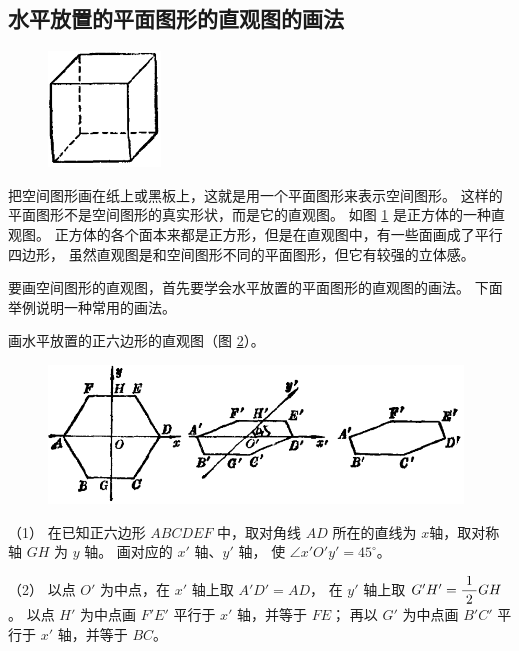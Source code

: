 \subsection{水平放置的平面图形的直观图的画法}\label{subsec:1-3}

\begin{enhancedline}

\begin{figure}
    \centering
    \includegraphics[width=3cm]{../pic/ltjh-ch1-08.png}
    \caption{}\label{fig:ltjh-1-8}
\end{figure}

把空间图形画在纸上或黑板上，这就是用一个平面图形来表示空间图形。
这样的平面图形不是空间图形的真实形状，而是它的直观图。
如图 \ref{fig:ltjh-1-8} 是正方体的一种直观图。
正方体的各个面本来都是正方形，但是在直观图中，有一些面画成了平行四边形，
虽然直观图是和空间图形不同的平面图形，但它有较强的立体感。

要画空间图形的直观图，首先要学会水平放置的平面图形的直观图的画法。
下面举例说明一种常用的画法。


\liti 画水平放置的正六边形的直观图（图 \ref{fig:ltjh-1-9}）。

\begin{figure}[htbp]
    \centering
    \includegraphics[width=11cm]{../pic/ltjh-ch1-09.png}
    \caption{}\label{fig:ltjh-1-9}
\end{figure}

\huafa （1） 在已知正六边形 $ABCDEF$ 中，取对角线 $AD$ 所在的直线为 $x$轴，取对称轴 $GH$ 为 $y$ 轴。
画对应的 $x'$ 轴、$y'$ 轴， 使 $\angle x'O'y' = 45^\circ$。

（2） 以点 $O'$ 为中点，在 $x'$ 轴上取 $A'D' = AD$， 在 $y'$ 轴上取 $G'H' = \dfrac{\; 1 \;}{2} GH$。
以点 $H'$ 为中点画 $F'E'$ 平行于 $x'$ 轴，并等于 $FE$；
再以 $G'$ 为中点画 $B'C'$ 平行于 $x'$ 轴，并等于 $BC$。


\end{enhancedline}
